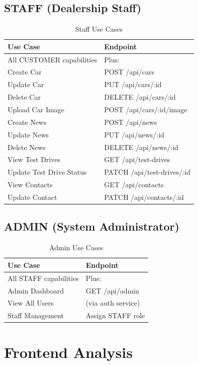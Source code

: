 \documentclass[12pt,a4paper]{article}
\begin{document}
\subsection{STAFF (Dealership Staff)}

\begin{table}[h]
\centering
\caption{Staff Use Cases}
\begin{tabular}{@{}ll@{}}
\toprule
Use Case & Endpoint \\
\midrule
All CUSTOMER capabilities & Plus: \\
Create Car & POST /api/cars \\
Update Car & PUT /api/cars/:id \\
Delete Car & DELETE /api/cars/:id \\
Upload Car Image & POST /api/cars/:id/image \\
Create News & POST /api/news \\
Update News & PUT /api/news/:id \\
Delete News & DELETE /api/news/:id \\
View Test Drives & GET /api/test-drives \\
Update Test Drive Status & PATCH /api/test-drives/:id \\
View Contacts & GET /api/contacts \\
Update Contact & PATCH /api/contacts/:id \\
\bottomrule
\end{tabular}
\end{table}

\subsection{ADMIN (System Administrator)}

\begin{table}[h]
\centering
\caption{Admin Use Cases}
\begin{tabular}{@{}ll@{}}
\toprule
Use Case & Endpoint \\
\midrule
All STAFF capabilities & Plus: \\
Admin Dashboard & GET /api/admin \\
View All Users & (via auth service) \\
Staff Management & Assign STAFF role \\
\bottomrule
\end{tabular}
\end{table}

\newpage

\section{Frontend Analysis}
\label{sec:frontend}
\end{document}
